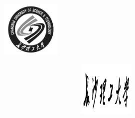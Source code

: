 \documentclass[border=5pt]{standalone}
\begin{document}
\begin{minipage}{2.89cm}
  \centering
  \vspace*{-.32cm}
  \includegraphics[width=2.89cm,height=2.679cm]{../csustgreylogo_2640by2449.jpg}
\end{minipage}
\hspace{-.4cm}
\begin{minipage}{10.844cm}
  \centering{}\bfseries 
  \includegraphics[width=10.844cm,height=2.658cm]{../csustname_2640by2640.png}
  
  \vspace*{-.15cm}
  
  \vspace*{.15cm}
\end{minipage}
\end{document}
